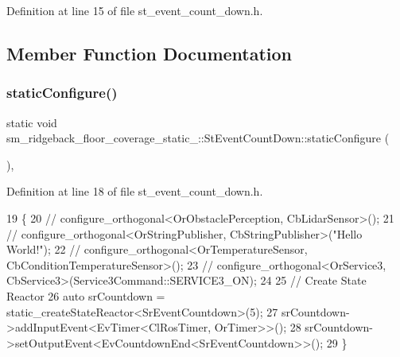 Definition at line 15 of file st\+\_\+event\+\_\+count\+\_\+down.\+h.



\subsection{Member Function Documentation}
\mbox{\label{structsm__ridgeback__floor__coverage__static__1_1_1StEventCountDown_aef24befbf9c60e4f9c3e068d13c69728}} 
\subsubsection{\texorpdfstring{static\+Configure()}{staticConfigure()}}
{\footnotesize\ttfamily static void sm\+\_\+ridgeback\+\_\+floor\+\_\+coverage\+\_\+static\+\_\+::\+St\+Event\+Count\+Down\+::static\+Configure (\begin{DoxyParamCaption}{ }\end{DoxyParamCaption})\hspace{0.3cm}{\ttfamily [inline]}, {\ttfamily [static]}}



Definition at line 18 of file st\+\_\+event\+\_\+count\+\_\+down.\+h.


\begin{DoxyCode}
19     \{
20         \textcolor{comment}{//   configure\_orthogonal<OrObstaclePerception, CbLidarSensor>();}
21         \textcolor{comment}{//   configure\_orthogonal<OrStringPublisher, CbStringPublisher>("Hello World!");}
22         \textcolor{comment}{//   configure\_orthogonal<OrTemperatureSensor, CbConditionTemperatureSensor>();}
23         \textcolor{comment}{//   configure\_orthogonal<OrService3, CbService3>(Service3Command::SERVICE3\_ON);      }
24         
25         \textcolor{comment}{// Create State Reactor}
26         \textcolor{keyword}{auto} srCountdown = static\_createStateReactor<SrEventCountdown>(5);        
27         srCountdown->addInputEvent<EvTimer<ClRosTimer, OrTimer>>();
28         srCountdown->setOutputEvent<EvCountdownEnd<SrEventCountdown>>();
29     \}
\end{DoxyCode}


